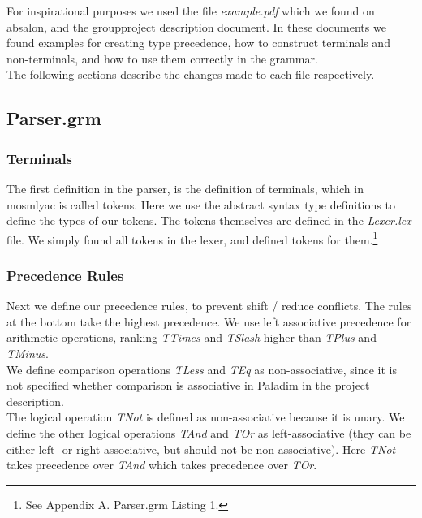 \documentclass[12pt,a4paper,english]{article}
\begin{document}
For inspirational purposes we used the file \textit{example.pdf} which we found on absalon, and the groupproject description document. In these documents we found examples for creating type precedence, how to construct terminals and non-terminals, and how to use them correctly in the grammar.  \\

The following sections describe the changes made to each file respectively.
\subsection{Parser.grm}
\subsubsection{Terminals}
The first definition in the parser, is the definition of terminals, which in mosmlyac is called tokens.
Here we use the abstract syntax type definitions to define the types of our tokens. The tokens themselves are defined in the \textit{Lexer.lex} file. We simply found all tokens in the lexer, and defined tokens for them.\footnote{See Appendix A. Parser.grm Listing 1.}

\subsubsection{Precedence Rules}

Next we define our precedence rules, to prevent shift / reduce conflicts. The rules at the bottom take the highest precedence.
We use left associative precedence for arithmetic operations, ranking \textit{TTimes} and \textit{TSlash} higher than \textit{TPlus} and \textit{TMinus}. \\

We define comparison operations \textit{TLess} and \textit{TEq} as non-associative, since it is not specified whether comparison is associative in Paladim in the project description. \\

The logical operation \textit{TNot} is defined as non-associative because it is unary. We define the other logical operations \textit{TAnd} and \textit{TOr} as left-associative (they can be either left- or right-associative, but should not be non-associative). Here \textit{TNot} takes precedence over \textit{TAnd} which takes precedence over \textit{TOr}. \\
\end{document}
